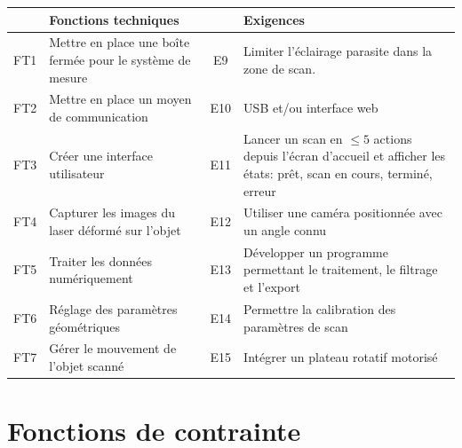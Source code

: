 \documentclass[11pt,a4paper]{report}
\begin{document}
\begin{center}
\begin{tabularx}{\textwidth}{c X c X}
\toprule
 & \textbf{Fonctions techniques} &  & \textbf{Exigences} \\
\midrule
FT1 & Mettre en place une boîte fermée pour le système de mesure & E9 & Limiter l'éclairage parasite dans la zone de scan. \\
\midrule
FT2 & Mettre en place un moyen de communication & E10 & USB et/ou interface web \\
\midrule
FT3 & Créer une interface utilisateur & E11 & Lancer un scan en $\leq 5$ actions depuis l'écran d'accueil et afficher les états: prêt, scan en cours, terminé, erreur \\
\midrule
FT4 & Capturer les images du laser déformé sur l’objet & E12 & Utiliser une caméra positionnée avec un angle connu \\
\midrule
FT5 & Traiter les données numériquement & E13 & Développer un programme permettant le traitement, le filtrage et l’export \\
\midrule
FT6 & Réglage des paramètres géométriques & E14 & Permettre la calibration des paramètres de scan \\
\midrule
FT7 & Gérer le mouvement de l’objet scanné & E15 & Intégrer un plateau rotatif motorisé \\
\bottomrule
\end{tabularx}
\end{center}

\section{Fonctions de contrainte}
\end{document}
